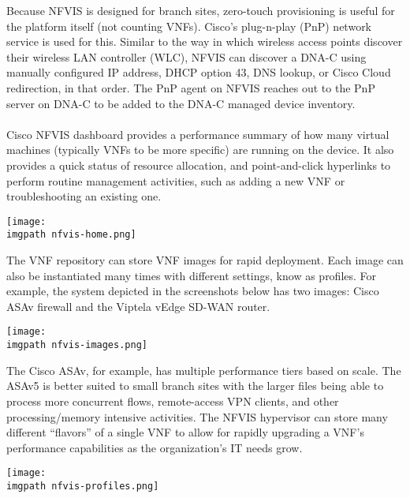 Because NFVIS is designed for branch sites, zero-touch provisioning is useful
for the platform itself (not counting VNFs). Cisco's plug-n-play (PnP) network
service is used for this. Similar to the way in which wireless access points
discover their wireless LAN controller (WLC), NFVIS can discover a DNA-C using
manually configured IP address, DHCP option 43, DNS lookup, or Cisco Cloud
redirection, in that order. The PnP agent on NFVIS reaches out to the PnP
server on DNA-C to be added to the DNA-C managed device inventory.
\\ \\
Cisco NFVIS dashboard provides a performance summary of how many virtual machines
(typically VNFs to be more specific) are running on the device. It also
provides a quick status of resource allocation, and point-and-click hyperlinks
to perform routine management activities, such as adding a new VNF or
troubleshooting an existing one.

    \begin{minipage}[t]{\linewidth}
	  \centering
      \texttt{[image: \\imgpath nfvis-home.png]}
    \end{minipage}

The VNF repository can store VNF images for rapid deployment. Each image can
also be instantiated many times with different settings, know as profiles. For
example, the system depicted in the screenshots below has two images: Cisco
ASAv firewall and the Viptela vEdge SD-WAN router.

    \begin{minipage}[t]{\linewidth}
	  \centering
      \texttt{[image: \\imgpath nfvis-images.png]}
    \end{minipage}

The Cisco ASAv, for example, has multiple performance tiers based on scale.
The ASAv5 is better suited to small branch sites with the larger files being
able to process more concurrent flows, remote-access VPN clients, and other
processing/memory intensive activities. The NFVIS hypervisor can store many
different ``flavors'' of a single VNF to allow for rapidly upgrading a VNF's
performance capabilities as the organization's IT needs grow.

    \begin{minipage}[t]{\linewidth}
	  \centering
      \texttt{[image: \\imgpath nfvis-profiles.png]}
    \end{minipage}

